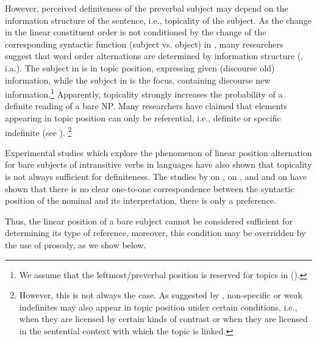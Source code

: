 \documentclass[output=paper]{langscibook}
\begin{document}

However, perceived definiteness of the preverbal subject may depend on the information structure of the sentence, i.e., topicality of the subject. As the change in the linear constituent order is not conditioned by the change of the corresponding syntactic function (subject vs. object) in , many researchers suggest that word order alternations are determined by information structure (\citealt{Mathesius1964,Sgall1972,Hajicova1974,Isacenko1976,Yokoyama1987,Comrie1981}, i.a.). The subject in  is in topic position,  expressing given (discourse old) information, while the subject in  is the focus, containing discourse new information.\footnote{We assume that the leftmost/preverbal position is reserved for topics in  (\citealt{Geist2010,Jasinskaja2016}).} Apparently, topicality strongly increases the probability of a definite reading of a bare NP. Many researchers have claimed that elements appearing in topic position can only be referential, i.e., definite or specific indefinite (see \citealt{Reinhart1981,Erteschik-Shir1998,Portner.Yabushita2001,Endriss2009}).%
\footnote{However, this is not always the case. As suggested by \citet{Leonetti2010}, non-specific or weak indefinites may also appear in topic position under certain conditions, i.e., when they are licensed by certain kinds of contrast %
or when they are licensed in the sentential context with which the topic is linked.}

Experimental studies which explore the phenomenon of linear position alternation for bare subjects of intransitive verbs in  languages have also shown that topicality is not always sufficient for definiteness. The studies by \citet{Simik2014} on , \citet{Czardybon.etal2014} on , and \citet{Borik.etal2019} and \citet{Seres.etal2019} on  have shown that there is no clear one-to-one correspondence between the syntactic position of the nominal and its interpretation, there is only a preference.

Thus, the linear position of a bare subject %
cannot be considered sufficient for determining its type of reference, moreover, this condition may be overridden by the use of prosody, as we show below.
\end{document}
